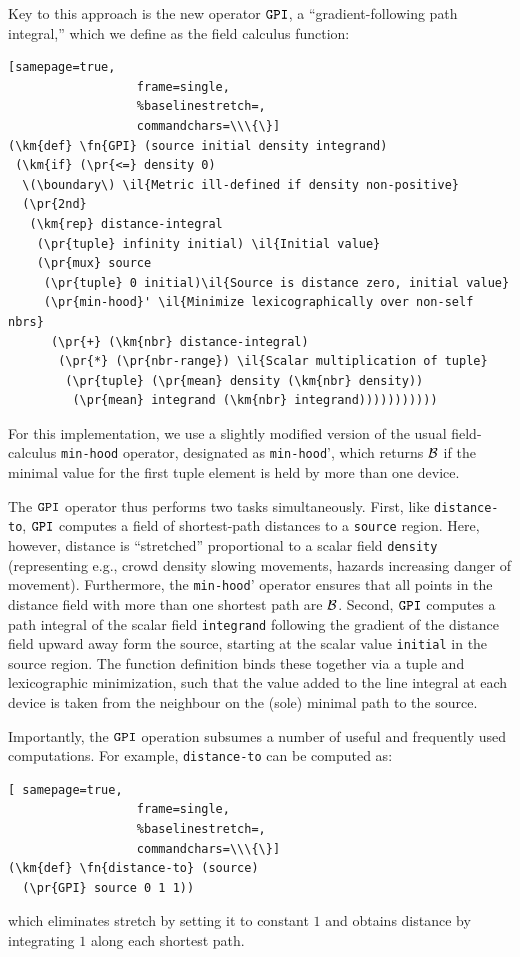\documentclass[12pt,a4paper,twoside,openright]{book}
\begin{document}
Key to this approach is the new operator $\texttt{GPI}$, a ``gradient-following path integral,'' which we define as the field calculus function:
\begin{Verbatim}[samepage=true,
                  frame=single,
                  %baselinestretch=,
                  commandchars=\\\{\}]
(\km{def} \fn{GPI} (source initial density integrand)
 (\km{if} (\pr{<=} density 0)
  \(\boundary\) \il{Metric ill-defined if density non-positive}
  (\pr{2nd} 
   (\km{rep} distance-integral
    (\pr{tuple} infinity initial) \il{Initial value}
    (\pr{mux} source 
     (\pr{tuple} 0 initial)\il{Source is distance zero, initial value}
     (\pr{min-hood}' \il{Minimize lexicographically over non-self nbrs}
      (\pr{+} (\km{nbr} distance-integral)
       (\pr{*} (\pr{nbr-range}) \il{Scalar multiplication of tuple}
        (\pr{tuple} (\pr{mean} density (\km{nbr} density))
         (\pr{mean} integrand (\km{nbr} integrand)))))))))))
\end{Verbatim}
For this implementation, we use a slightly modified version of the usual field-calculus {\tt min-hood} operator, designated as {\tt min-hood}', which returns $\mathcal{B}$ if the minimal value for the first tuple element is held by more than one device.

The $\texttt{GPI}$ operator thus performs two tasks simultaneously.  First, like {\tt distance-to}, $\texttt{GPI}$ computes a field of shortest-path distances to a {\tt source} region.
%
Here, however, distance is ``stretched'' proportional to a scalar field {\tt density} (representing e.g., crowd density slowing movements, hazards increasing danger of movement).
%
Furthermore, the {\tt min-hood}' operator ensures that all points in the distance field with more than one shortest path are $\mathcal{B}$.
%
Second, $\texttt{GPI}$ computes a path integral of the scalar field {\tt integrand} following the gradient of the distance field upward away form the source, starting at the scalar value {\tt initial} in the source region.
%
The function definition binds these together via a tuple and lexicographic minimization, such that the value added to the line integral at each device is taken from the neighbour on the (sole) minimal path to the source.

Importantly, the $\texttt{GPI}$ operation subsumes a number of useful and frequently used computations.
%
For example, \texttt{distance-to} can be computed as:
\begin{Verbatim}[ samepage=true,
                  frame=single,
                  %baselinestretch=,
                  commandchars=\\\{\}]
(\km{def} \fn{distance-to} (source)
  (\pr{GPI} source 0 1 1))
\end{Verbatim}
which eliminates stretch by setting it to constant $1$ and obtains distance by integrating $1$ along each shortest path.
\end{document}
